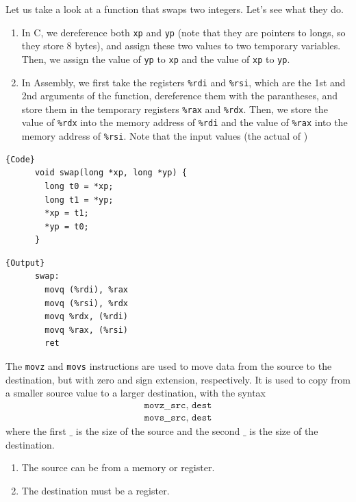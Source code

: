   \begin{example}
    \label{ex:swap-function-2}
    Let us take a look at a function that swaps two integers. Let's see what they do. 
    \begin{enumerate}
      \item In C, we dereference both \texttt{xp} and \texttt{yp} (note that they are pointers to longs, so they store 8 bytes), and assign these two values to two temporary variables. Then, we assign the value of \texttt{yp} to \texttt{xp} and the value of \texttt{xp} to \texttt{yp}.
      \item In Assembly, we first take the registers \texttt{\%rdi} and \texttt{\%rsi}, which are the 1st and 2nd arguments of the function, dereference them with the parantheses, and store them in the temporary registers \texttt{\%rax} and \texttt{\%rdx}. Then, we store the value of \texttt{\%rdx} into the memory address of \texttt{\%rdi} and the value of \texttt{\%rax} into the memory address of \texttt{\%rsi}. Note that the input values (the actual of )
    \end{enumerate}

    \noindent\begin{minipage}{.5\textwidth}
    \begin{lstlisting}[]{Code}
      void swap(long *xp, long *yp) {
        long t0 = *xp;
        long t1 = *yp;
        *xp = t1;
        *yp = t0;
      }
    \end{lstlisting}
    \end{minipage}
    \hfill
    \begin{minipage}{.49\textwidth}
    \begin{lstlisting}[]{Output}
      swap:
        movq (%rdi), %rax
        movq (%rsi), %rdx
        movq %rdx, (%rdi)
        movq %rax, (%rsi)
        ret
    \end{lstlisting}
    \end{minipage}
  \end{example}

  \begin{definition}
    \label{def:movz-and-movs}
    The \texttt{movz} and \texttt{movs} instructions are used to move data from the source to the destination, but with zero and sign extension, respectively. It is used to copy from a smaller source value to a larger destination, with the syntax 
    \begin{align*}
      \texttt{movz\_\_ src, dest} \\ 
      \texttt{movs\_\_ src, dest} 
    \end{align*}
    where the first $\_$ is the size of the source and the second $\_$ is the size of the destination. 
    \begin{enumerate}
      \item The source can be from a memory or register. 
      \item The destination must be a register. 
    \end{enumerate}
  \end{definition}

